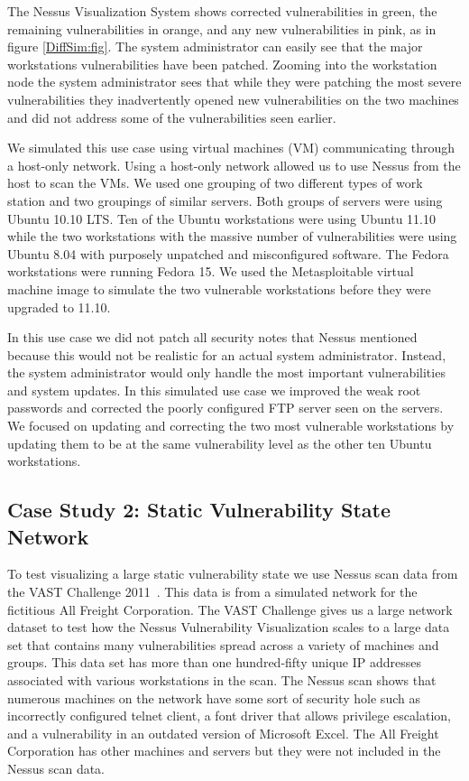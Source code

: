 \documentclass{acm_proc_article-sp}
\begin{document}
The Nessus Visualization System shows corrected
vulnerabilities in green, the remaining vulnerabilities in orange, and any new
vulnerabilities in pink, as in figure \ref{DiffSim:fig}. The system administrator can easily see that the
major workstations vulnerabilities have been patched. Zooming into the
workstation node the system administrator sees that while they were patching the most
severe vulnerabilities they inadvertently opened new vulnerabilities on the two
machines and did not address some of the vulnerabilities seen earlier.

We simulated this use case using virtual machines (VM) communicating through a host-only
network. Using a host-only network allowed us to use Nessus from the host
to scan the VMs. We used one grouping of two different types of work station
and two groupings of similar servers. Both groups of servers were using Ubuntu 10.10 LTS.
Ten of the Ubuntu workstations were using Ubuntu 11.10 while the two workstations
with the massive number of vulnerabilities were using Ubuntu 8.04 with
purposely unpatched and misconfigured software.
The Fedora workstations were running Fedora 15.  We used the Metasploitable
virtual machine image to simulate the two vulnerable workstations before they
were upgraded to 11.10.

In this use case we did not patch all security notes that Nessus mentioned
because this would not be realistic for an actual system administrator. Instead,
the system administrator would only handle the most important vulnerabilities and
system updates. In this simulated use case we improved the weak root passwords
and corrected the poorly configured FTP server seen on the servers. We focused on updating
and correcting the two most vulnerable workstations by updating them to be at
the same vulnerability level as the other ten Ubuntu workstations.



\subsection{Case Study 2: Static Vulnerability State Network }
To test visualizing a large static vulnerability state we use Nessus scan data from
the VAST Challenge 2011~\cite{VAST2011}. This data is from a simulated network for the
fictitious All Freight Corporation. The VAST Challenge gives us a large network
dataset to test how the Nessus Vulnerability Visualization scales to a large
data set that contains many vulnerabilities spread across a variety of machines and
groups. This data set has more than one
hundred-fifty unique IP addresses associated with various workstations in the
scan. The Nessus scan shows that numerous
machines on the network have some sort of security hole such as incorrectly
configured telnet client, a font driver that allows privilege escalation, and a
vulnerability in an outdated version of Microsoft Excel. The All Freight
Corporation has other machines and servers but they were not included in the
Nessus scan data.
\end{document}
